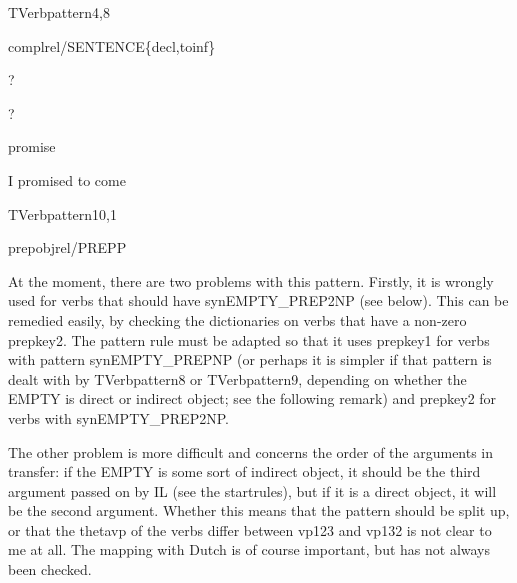 \newpage
{}
\begin{vpattern}
 TVerbpattern4,8   
\csritem \mbox{}\\
     \begin{csr}
       complrel/SENTENCE\{decl,toinf\}
     \end{csr}
\remarksitem
\end{vpattern}


\begin{thetadescr}
\evitem ?
\esitem
     \begin{examples}
        \example ?
     \end{examples}
\end{thetadescr}



\begin{thetadescr}
\evitem promise
\esitem
     \begin{examples}
        \example  I promised to come
     \end{examples}
\end{thetadescr}


\newpage
{}
\begin{vpattern}
 TVerbpattern10,1
\csritem \mbox{}\\
     \begin{csr}
       prepobjrel/PREPP
     \end{csr}
\remarksitem At the moment, there are two problems with this pattern. Firstly, 
it is wrongly used for verbs that should have synEMPTY\_PREP2NP (see below). 
This can be remedied easily, by checking the dictionaries on verbs that have a 
non-zero prepkey2. The pattern rule must be adapted so that it uses prepkey1 
for verbs with 
pattern synEMPTY\_PREPNP (or perhaps it is simpler if that pattern is dealt 
with by 
TVerbpattern8 or TVerbpattern9, depending on whether the EMPTY is direct or 
indirect object; see the following remark) and prepkey2 
for verbs with synEMPTY\_PREP2NP. 

The other problem is more difficult and concerns the order 
of the arguments in transfer: if the EMPTY is some sort of indirect object, it 
should be the third argument passed on by IL (see the startrules), 
but if it is a direct object, 
it will be the second argument. Whether this means that the pattern should be 
split up, or that the thetavp of the verbs differ between vp123 and vp132 is 
not clear to me at all. The mapping with Dutch is of course important, but has 
not always been checked.
\end{vpattern}

